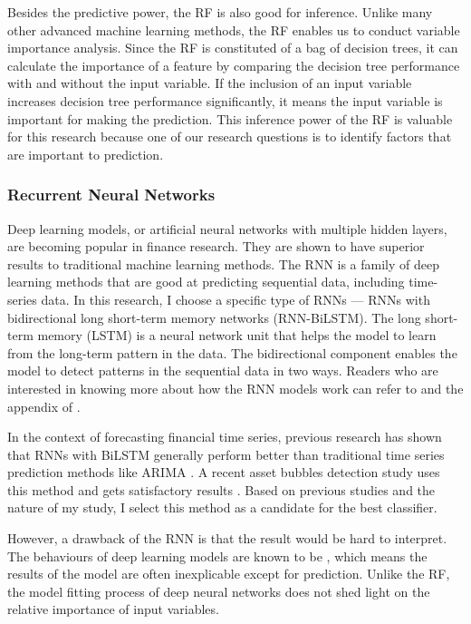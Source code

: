 \documentclass[12pt, man, a4paper, floatsintext]{apa7}
\begin{document}
Besides the predictive power, the RF is also good for inference. Unlike many other advanced machine learning methods, the RF enables us to conduct variable importance analysis. Since the RF is constituted of a bag of decision trees, it can calculate the importance of a feature by comparing the decision tree performance with and without the input variable. If the inclusion of an input variable increases decision tree performance significantly, it means the input variable is important for making the prediction. This inference power of the RF is valuable for this research because one of our research questions is to identify factors that are important to prediction.

\subsubsection{Recurrent Neural Networks}

Deep learning models, or artificial neural networks with multiple hidden layers, are becoming popular in finance research. They are shown to have superior results to traditional machine learning methods. The RNN is a family of deep learning methods that are good at predicting sequential data, including time-series data. In this research, I choose a specific type of RNNs — RNNs with bidirectional long short-term memory networks (RNN-BiLSTM). The long short-term memory (LSTM) is a neural network unit that helps the model to learn from the long-term pattern in the data. The bidirectional component enables the model to detect patterns in the sequential data in two ways. Readers who are interested in knowing more about how the RNN models work can refer to \textcite{lstm} and the appendix of \textcite{Bash2020}.

In the context of forecasting financial time series, previous research has shown that RNNs with BiLSTM generally perform better than traditional time series prediction methods like ARIMA \parencite{Siam2019}. A recent asset bubbles detection study uses this method and gets satisfactory results \parencite{Bash2020}. Based on previous studies and the nature of my study, I select this method as a candidate for the best classifier. 

However, a drawback of the RNN is that the result would be hard to interpret. The behaviours of deep learning models are known to be , which means the results of the model are often inexplicable except for prediction. Unlike the RF, the model fitting process of deep neural networks does not shed light on the relative importance of input variables.
\end{document}
